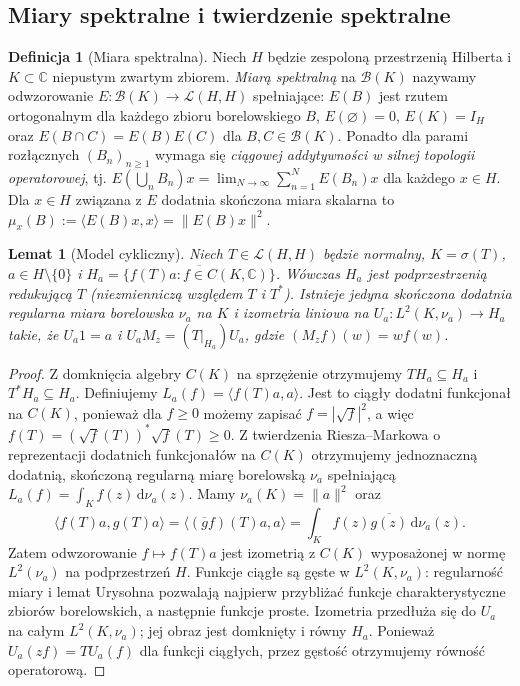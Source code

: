 \documentclass[11pt,a4paper]{article}
\numberwithin{equation}{section}
\theoremstyle{plain}
\newtheorem{lemat}[twierdzenie]{Lemat}
\theoremstyle{definition}
\newtheorem{definicja}[twierdzenie]{Definicja}
\theoremstyle{remark}
\newcommand{\C}{\mathbb C}
\begin{document}
\subsection{Miary spektralne i twierdzenie spektralne}

\begin{definicja}[Miara spektralna]
\label{def:pvm32}
Niech $H$ będzie zespoloną przestrzenią Hilberta i $K\subset\C$
niepustym zwartym zbiorem. \emph{Miarą spektralną} na
$\mathcal B(K)$ nazywamy odwzorowanie
$E:\mathcal B(K)\to\mathcal L(H,H)$ spełniające:
$E(B)$ jest rzutem ortogonalnym dla każdego zbioru borelowskiego $B$,
$E(\varnothing)=0$, $E(K)=I_H$ oraz
$E(B\cap C)=E(B)E(C)$ dla $B,C\in\mathcal B(K)$.
Ponadto dla parami rozłącznych $(B_n)_{n\geq1}$ wymaga się
\emph{ciągowej addytywności w silnej topologii operatorowej}, tj.
$E(\bigcup_nB_n)x=\lim_{N\to\infty}\sum_{n=1}^NE(B_n)x$
dla każdego $x\in H$.
Dla $x\in H$ związana z $E$ dodatnia skończona miara skalarna
to $\mu_x(B):=\langle E(B)x,x\rangle=\|E(B)x\|^2$.
\end{definicja}

\begin{lemat}[Model cykliczny]
\label{lem:cyclic-model32}
Niech $T\in\mathcal L(H,H)$ będzie normalny, $K=\sigma(T)$,
$a\in H\setminus\{0\}$ i
$H_a=\overline{\{f(T)a:f\in C(K,\C)\}}$.
Wówczas $H_a$ jest podprzestrzenią redukującą $T$
(niezmienniczą względem $T$ i $T^*$).
Istnieje jedyna skończona dodatnia regularna miara borelowska
$\nu_a$ na $K$ i izometria liniowa na
$U_a:L^2(K,\nu_a)\to H_a$ takie, że
$U_a1=a$ i $U_aM_z=(T|_{H_a})U_a$, gdzie
$(M_zf)(w)=wf(w)$.
\end{lemat}
\begin{proof}
Z domknięcia algebry $C(K)$ na sprzężenie otrzymujemy
$T H_a\subseteq H_a$ i $T^*H_a\subseteq H_a$.
Definiujemy $L_a(f)=\langle f(T)a,a\rangle$. Jest to ciągły
dodatni funkcjonał na $C(K)$, ponieważ dla $f\geq0$
możemy zapisać $f=|\sqrt f|^2$, a więc
$f(T)=(\sqrt f(T))^*\sqrt f(T)\geq0$.
Z twierdzenia Riesza--Markowa o reprezentacji dodatnich
funkcjonałów na $C(K)$ otrzymujemy jednoznaczną dodatnią,
skończoną regularną miarę borelowską $\nu_a$ spełniającą
$L_a(f)=\int_K f(z)\,\mathrm d\nu_a(z)$.
Mamy $\nu_a(K)=\|a\|^2$ oraz
\[
 \langle f(T)a,g(T)a\rangle
 =\langle (\overline g f)(T)a,a\rangle
 =\int_K f(z)\overline{g(z)}\,\mathrm d\nu_a(z).
\]
Zatem odwzorowanie $f\mapsto f(T)a$ jest izometrią z
$C(K)$ wyposażonej w normę $L^2(\nu_a)$ na podprzestrzeń $H$.
Funkcje ciągłe są gęste w $L^2(K,\nu_a)$: regularność
miary i lemat Urysohna pozwalają najpierw przybliżać
funkcje charakterystyczne zbiorów borelowskich, a następnie
funkcje proste. Izometria przedłuża się do $U_a$ na całym
$L^2(K,\nu_a)$; jej obraz jest domknięty i równy $H_a$.
Ponieważ $U_a(zf)=T U_a(f)$ dla funkcji ciągłych,
przez gęstość otrzymujemy równość operatorową.
\end{proof}
\end{document}
